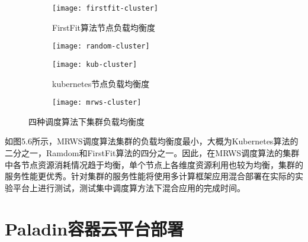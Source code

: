 \begin{figure}[H]
	\centering%
	\begin{subfigure}{7cm}
		\texttt{[image: firstfit-cluster]}
		\caption{FirstFit算法节点负载均衡度}
	\end{subfigure}%
	\hspace{0.5cm}%
	\begin{subfigure}{7cm}
		\texttt{[image: random-cluster]}
	\end{subfigure}
	\begin{subfigure}{7cm}
		\texttt{[image: kub-cluster]}
		\caption{kubernetes节点负载均衡度}
	\end{subfigure}%
	\hspace{0.5cm}%
	\begin{subfigure}{7cm}
		\texttt{[image: mrws-cluster]}
	\end{subfigure}
	\caption{四种调度算法下集群负载均衡度}	
\end{figure}

如图5.6所示，MRWS调度算法集群的负载均衡度最小，大概为Kubernetes算法的二分之一，Ramdom和FirstFit算法的四分之一。因此，在MRWS调度算法的集群中各节点资源消耗情况趋于均衡，单个节点上各维度资源利用也较为均衡，集群的服务性能更优秀。针对集群的服务性能将使用多计算框架应用混合部署在实际的实验平台上进行测试，测试集中调度算方法下混合应用的完成时间。

\section{Paladin容器云平台部署}
























